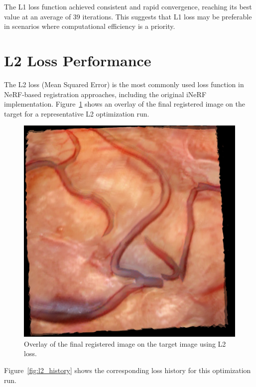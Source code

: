 The L1 loss function achieved consistent and rapid convergence, reaching its best value at an average of 39 iterations. This suggests that L1 loss may be preferable in scenarios where computational efficiency is a priority.

\section{L2 Loss Performance}

The L2 loss (Mean Squared Error) is the most commonly used loss function in NeRF-based registration approaches, including the original iNeRF implementation. Figure~\ref{fig:l2_overlay} shows an overlay of the final registered image on the target for a representative L2 optimization run.

\begin{figure}[H]
  \centering
  \includegraphics[scale=0.5]{figures/l2/alignment_overlay.png}
  \caption[Registration result with L2 loss]{Overlay of the final registered image on the target image using L2 loss.}
  \label{fig:l2_overlay}
\end{figure}

Figure~\ref{fig:l2_history} shows the corresponding loss history for this optimization run.

